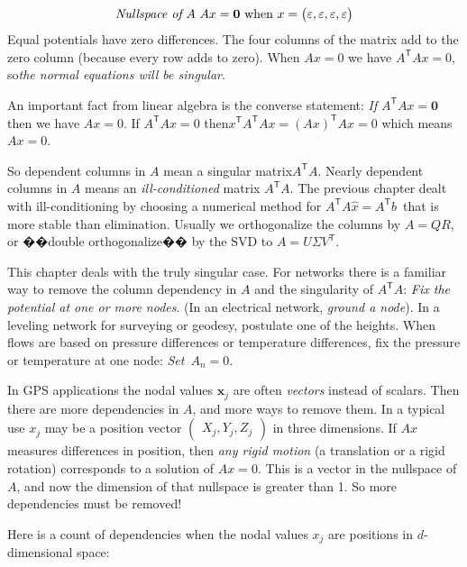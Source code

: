 \begin{equation}
	\emph{Nullspace of}\ A\  Ax = \mathbf{0}\  \text{when}\ x=
	\begin{pmatrix}
		\varepsilon,\varepsilon,\varepsilon,\varepsilon
	\end{pmatrix}
\end{equation}
Equal potentials have zero differences. The four columns of the matrix add to the zero column (because every row adds to zero). When $Ax = 0$ we have $A^\mathsf{T}Ax = 0$, so\emph{the normal equations will be singular}.
\par
An important fact from linear algebra is the converse statement: \emph{If} $A^\mathsf{T}Ax = \mathbf{0}$ then we have $Ax = 0$. If $A^\mathsf{T}Ax = 0$ then$x^\mathsf{T}A^\mathsf{T}Ax = (Ax)^\mathsf{T}{Ax} = 0$ which means $Ax = 0$.
\par
So dependent columns in $A$ mean a singular matrix$A^\mathsf{T}A$. Nearly dependent columns in $A$ means an \emph{ill-conditioned} matrix $A^\mathsf{T}A$. The previous chapter dealt with ill-conditioning by choosing a numerical method for $A^\mathsf{T}A\hat{x} = A^\mathsf{T}b$\ that is more stable than elimination.
Usually we orthogonalize the columns by $A= QR$, or ��double orthogonalize�� by the SVD to $A = U{\Sigma V}^\mathsf{T}$.
\par
This chapter deals with the truly singular case. For networks there is a familiar way to remove the column dependency in $A$ and the singularity of  $A^\mathsf{T}A$: \emph{Fix the potential at one or more nodes}. (In an electrical network, \emph{ground a node}). In a leveling network for surveying or geodesy, postulate one of the heights. When flows are based on pressure differences or temperature differences, fix the pressure or temperature at one node: \emph{Set}\ ${A}_n = 0$.
\par
In GPS applications the nodal values ${\mathbf{x}}_j$ are often \emph{vectors} instead of scalars. Then there are more dependencies in $A$, and more ways to remove them. In a typical use ${x}_j$ may be a position vector
$\begin{pmatrix}
{X}_j , {Y}_j , {Z}_j
\end{pmatrix}$
in three dimensions. If $Ax$ measures differences in position, then \emph{any rigid motion} (a translation or a rigid rotation) corresponds to a solution of $Ax = 0$. This is a vector in the nullspace of $A$, and now the dimension of that nullspace is greater than 1. So more dependencies must be removed!
\par
Here is a count of dependencies when the nodal values ${x}_j$ are positions in $d$-dimensional space:

